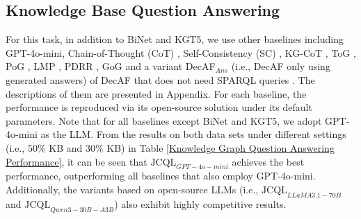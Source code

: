 \documentclass[11pt]{article}
\begin{document}


\subsection{Knowledge Base Question Answering} \label{4.3}
For this task, in addition to BiNet and KGT5, we use other baselines including GPT-4o-mini, Chain-of-Thought (CoT) \cite{wei2023chainofthoughtpromptingelicitsreasoning}, Self-Consistency (SC) \cite{wang2023selfconsistencyimproveschainthought}, KG-CoT \cite{DBLP:conf/ijcai/Zhao0W0024}, ToG \cite{sun2023thinkongraph}, PoG \cite{Plan-on-Graph}, LMP \cite{lmp}, PDRR \cite{pdrr}, GoG \cite{xu-etal-2024-generate} and a variant DecAF$_{Ans}$ (i.e., DecAF only using generated answers) of DecAF that does not need SPARQL queries \cite{decaf}. The descriptions of them are presented in Appendix. For each baseline, the performance is reproduced via its open-source solution under its default parameters. 
Note that for all baselines except BiNet and KGT5, we adopt GPT-4o-mini as the LLM. 
From the results on both data sets under different settings (i.e., $50\%$ KB and $30\%$ KB) in Table \ref{Knowledge Graph Question Answering Performance}, it can be seen that $\text{JCQL}_{GPT-4o-mini}$ achieves the best performance, outperforming all baselines that also employ GPT-4o-mini. Additionally, the variants based on open-source LLMs (i.e., $\text{JCQL}_{LLaMA3.1-70B}$ and $\text{JCQL}_{Qwen3-30B-A3B}$) also exhibit highly competitive results.
\end{document}
